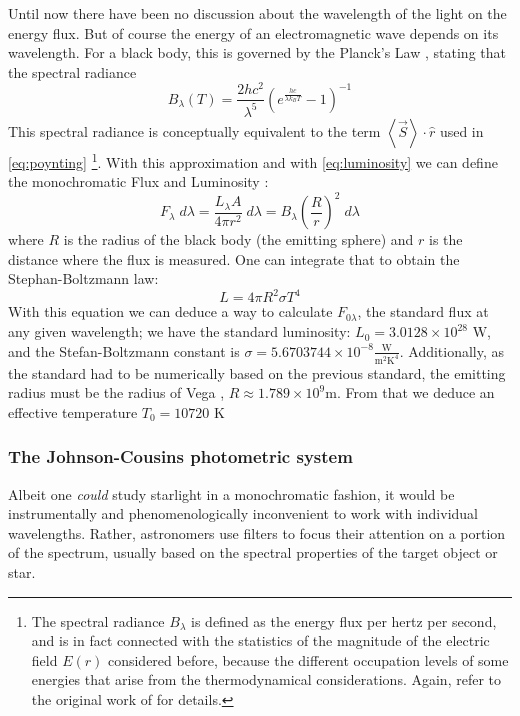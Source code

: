 	Until now there have been no discussion about the wavelength of the light on the energy flux. 
	But of course the energy of an electromagnetic wave depends on its wavelength. 
	For a black body, this is governed by the Planck's Law \citep{Planck1901}, stating that the spectral radiance
	\begin{equation}
		B_\lambda(T) = \frac{2hc^2}{\lambda^5}\left(e^{\frac{hc}{\lambda k_B T}}-1\right)^{-1}
	\end{equation}
	This spectral radiance is conceptually equivalent to the term $\left<\vec S\right>\cdot \hat r$ used in \autoref{eq:poynting} \footnote{
		The spectral radiance $B_\lambda$ is defined as the energy flux per hertz per second,
		and is in fact connected with the statistics of the magnitude of the electric field $E(r)$ considered before, 
		because the different occupation levels of some energies that arise from  the thermodynamical considerations.
		Again, refer to the original work of \cite{Planck1901}  for details.
	}. 
	With this approximation and with \autoref{eq:luminosity} we can define the monochromatic Flux and Luminosity \citep[Chapter~3, Section~5]{Carroll2017}:
	\begin{equation}
		F_\lambda \;d\lambda = \frac{L_\lambda A}{4\pi r^2} \;d\lambda = B_\lambda\left(\frac{R}{r}\right)^2 \;d\lambda
	\end{equation}
	where $R$ is the radius of the black body (the emitting sphere) and $r$ is the distance where the flux is measured.
	One can integrate that to obtain the Stephan-Boltzmann law:
	\begin{equation}
		L = 4\pi R^2 \sigma T^4
	\end{equation}
	With this equation we can deduce a way to calculate $F_{0\lambda}$, the standard flux at any given wavelength; 
	we have the standard luminosity: $L_0=3.0128\times10^{28}\text{ W}$, 
	and the Stefan-Boltzmann constant is $\sigma=5.6703744\times10^{-8}\frac{\text{W}}{\text{m}^2\text{K}^4}$. 
	Additionally, as the standard had to be numerically based on the previous standard, the emitting radius must be the radius of Vega \citep{Yoon2010}, $R\approx 1.789 \times 10^9 \text{m}$.
	From that we deduce an effective temperature $T_0 = 10720 \text{ K}$
	
	\subsubsection{The Johnson-Cousins photometric system}
	
	Albeit one \textit{could} study starlight in a monochromatic fashion, 
	it would be instrumentally and phenomenologically inconvenient to work with individual wavelengths.
	Rather, astronomers use filters to focus their attention on a portion of the spectrum,
	usually based on the spectral properties of the target object or star.
	
